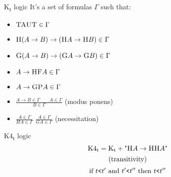 \documentclass{beamer}
\begin{document}
\begin{frame}{K\textsubscript{t} logic}
    It's a set of formulas $\Gamma$ such that:
    \begin{itemize}
        \item $\textsc{TAUT} \in \Gamma$
        \item $\textsc{H}(A \to B) \to (\textsc{H}A \to \textsc{H}B) \in \Gamma$
        \item $\textsc{G}(A \to B) \to (\textsc{G}A \to \textsc{G}B) \in \Gamma$
        \item $A \to \textsc{H}\textsc{F}A \in \Gamma$
        \item $A \to \textsc{G}\textsc{P}A \in \Gamma$
        \item $\frac{A \to B \in \Gamma \hspace{2em} A \in \Gamma}{B \in \Gamma}$ \tab\hspace{-4em}(modus ponens)
        \item $\frac{A \in \Gamma}{HA \in \Gamma}$ \hspace{0.5em} $\frac{A \in \Gamma}{GA \in \Gamma}$ \tab\hspace{-4em}(necessitation)
    \end{itemize}
\end{frame}

\begin{frame}{K4\textsubscript{t} logic}
    $$\textup{K4\textsubscript{t}} = \textup{K\textsubscript{t}} + \textup{"}\textsc{H}A \to \textsc{HH}A\textup{"}$$
    $$\textup{(transitivity)}$$
    \endgraf
    \bigskip
    \endgraf
    \bigskip
    $$\textup{if } t \texttt{<} {t'} \textup{ and } {t'} \texttt{<} {t''} \textup{ then } t \texttt{<} {t''}$$
\end{frame}
\end{document}
